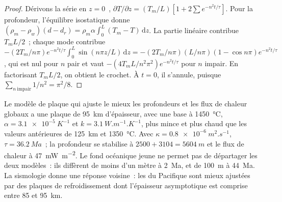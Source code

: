\begin{proof}
Dérivons la série en $z = 0$~, $\partial T/\partial z = (T_m/L)[1 +
2\sum e^{-n^2t/\tau}]$. Pour la profondeur, l'équilibre isostatique donne $(\rho_m -
\rho_w)(d - d_r) = \rho_m\alpha\int_0^L(T_m - T)\,\mathrm dz$. La partie linéaire
contribue $T_mL/2$~; chaque mode contribue $-(2T_m/n\pi)e^{-n^2t/\tau}
\int_0^L\sin(n\pi z/L)\,\mathrm dz = -(2T_m/n\pi)(L/n\pi)(1 - \cos n\pi)
e^{-n^2t/\tau}$, qui est nul pour $n$ pair et vaut $-(4T_mL/n^2\pi^2)
e^{-n^2t/\tau}$ pour $n$ impair. En factorisant $T_mL/2$, on obtient le crochet. À $t = 0$,
il s'annule, puisque $\sum_{n\ \text{impair}}1/n^2 = \pi^2/8$.
\end{proof}

Le modèle de plaque qui ajuste le mieux les profondeurs et les flux de chaleur globaux
a une plaque de \qty{95}{km} d'épaisseur, avec une base à \qty{1450}{\celsius}, $\alpha =
\qty{3.1e-5}{K^{-1}}$ et $k = \qty{3.1}{W.m^{-1}.K^{-1}}$, plus mince et plus chaud
que les valeurs antérieures de \qty{125}{km} et \qty{1350}{\celsius}. Avec $\kappa =
\qty{0.8e-6}{m^2.s^{-1}}$, $\tau = \qty{36.2}{Ma}$~; la profondeur se stabilise à
$2500 + 3104 = \qty{5604}{m}$ et le flux de chaleur à \qty{47}{mW.m^{-2}}. Le fond
océanique jeune ne permet pas de départager les deux modèles~: ils diffèrent de moins
d'un mètre à \qty{2}{Ma}, et de \qty{100}{m} à \qty{44}{Ma}. La sismologie donne une
réponse voisine~: les  du Pacifique sont mieux ajustées par des
plaques de refroidissement dont l'épaisseur asymptotique est comprise entre 85 et \qty{95}{km}.


